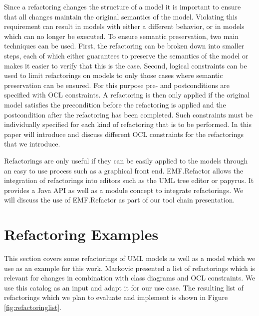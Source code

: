 \documentclass{llncs}
\begin{document}
Since a refactoring changes the structure of a model it is important to ensure that all changes maintain the original 
semantics of the model. Violating this requirement can result in models with either a different behavior, or in models 
which can no longer be executed. To ensure semantic preservation, two main techniques can be used. First, the refactoring 
can be broken down into smaller steps, each of which either guarantees to preserve the semantics of the model or makes it 
easier to verify that this is the case. Second, logical constraints can be used to limit refactorings on models to only 
those cases where semantic preservation can be ensured. For this purpose pre- and postconditions are specified with OCL 
constraints. A refactoring is then only applied if the original model satisfies the precondition before the refactoring is 
applied and the postcondition after the refactoring has been completed. Such constraints must be individually specified 
for each kind of refactoring that is to be performed. In this paper will introduce and discuss different OCL constraints 
for  the refactorings that we introduce.

Refactorings are only useful if they can be easily applied to the models through an easy to use process such as a 
graphical front end. EMF.Refactor allows the integration of refactorings into editors such as the UML tree editor or 
papyrus. It provides a Java API as well as a module concept to integrate refactorings. We will discuss the use of 
EMF.Refactor as part of our tool chain presentation.


\section{Refactoring Examples}
\label{refactoring-examples}

This section covers some refactorings of UML models as well as a model which we use as an example for this work. 
Markovic \cite{DBLP:journals/sosym/MarkovicB08} presented a list of refactorings which is relevant for changes in combination with class 
diagrams and OCL constraints. We use this catalog as an input and adapt it for our use case. The resulting list of 
refactorings which we plan to evaluate and implement is shown in Figure \ref{fig:refactoringlist}.
\end{document}
